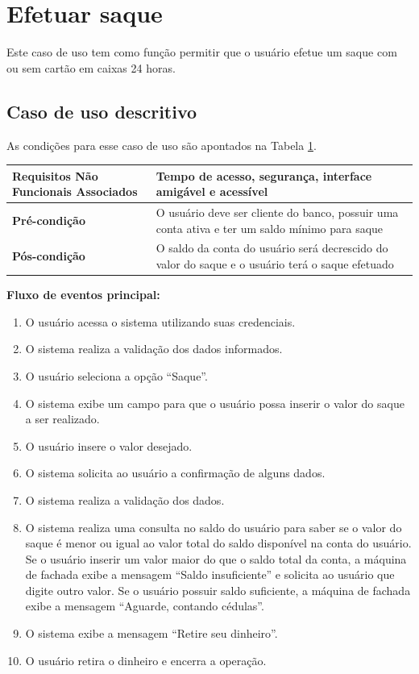 \section{Efetuar saque}

Este caso de uso tem como função permitir que o usuário efetue um saque com ou sem cartão em caixas 24 horas.

\subsection{Caso de uso descritivo}

As condições para esse caso de uso são apontados na Tabela \ref{tab:efetuarSaque}.

\begin{table}[h]
  \centering
  \begin{tabular}{|p{4cm} | p{10cm} |}
      \hline
      \small{\textbf{Requisitos Não Funcionais Associados}}	& Tempo de acesso, segurança, interface amigável e acessível	\\ \hline
      \small{\textbf{Pré-condição}}	&	O usuário deve ser cliente do banco, possuir uma conta ativa e ter um saldo mínimo para saque	\\ \hline
      \small{\textbf{Pós-condição}}	&	O saldo da conta do usuário será decrescido do valor do saque e o usuário terá o saque efetuado	\\ \hline
    \end{tabular}
 \label{tab:efetuarSaque}
\end{table}

\textbf{Fluxo de eventos principal:}

\begin{enumerate}
  \item O usuário acessa o sistema utilizando suas credenciais.
  \item O sistema realiza a validação dos dados informados.
  \item O usuário seleciona a opção ``Saque''.
  \item O sistema exibe um campo para que o usuário possa inserir o valor do saque a ser realizado.
  \item O usuário insere o valor desejado.
  \item O sistema solicita ao usuário a confirmação de alguns dados.
  \item O sistema realiza a validação dos dados.
  \item O sistema realiza uma consulta no saldo do usuário para saber se o valor do saque é menor ou igual ao valor total do saldo disponível na conta do usuário.
    \subitem Se o usuário inserir um valor maior do que o saldo total da conta, a máquina de fachada exibe a mensagem ``Saldo insuficiente'' e solicita ao usuário que digite outro valor.
    \subitem Se o usuário possuir saldo suficiente, a máquina de fachada exibe a mensagem ``Aguarde, contando cédulas''.
  \item O sistema exibe a mensagem ``Retire seu dinheiro''.
  \item O usuário retira o dinheiro e encerra a operação.
\end{enumerate}

